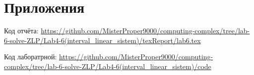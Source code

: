 \documentclass[a4]{article}
\begin{document}
\section{Приложения}

Код отчёта:\; \url{https://github.com/MisterProper9000/computing-complex/tree/lab-6-solve-ZLP/Lab4-6(interval_linear_sistem)/texReport/lab6.tex}

Код лаборатрной:\; \url{https://github.com/MisterProper9000/computing-complex/tree/lab-6-solve-ZLP/Lab4-6(interval_linear_sistem)/code}
\end{document}
